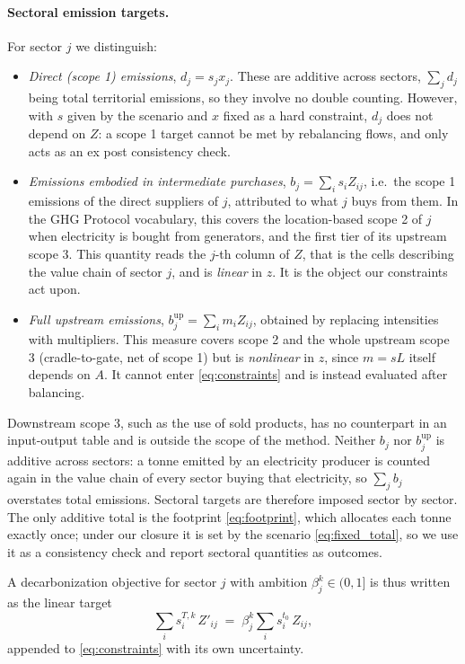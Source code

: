 \documentclass[11pt,a4paper]{article}
\begin{document}
\paragraph{Sectoral emission targets.}
For sector $j$ we distinguish:
\begin{itemize}
  \item \emph{Direct (scope 1) emissions}, $d_j = s_j x_j$. These are additive across
        sectors, $\sum_j d_j$ being total territorial emissions, so they involve no
        double counting. However, with $s$ given by the scenario and $x$ fixed as a hard
        constraint, $d_j$ does not depend on $Z$: a scope 1 target cannot be met by
        rebalancing flows, and only acts as an ex post consistency check.
  \item \emph{Emissions embodied in intermediate purchases},
        $b_j = \sum_i s_i Z_{ij}$, i.e.\ the scope 1 emissions of the direct suppliers
        of $j$, attributed to what $j$ buys from them. In the GHG Protocol vocabulary,
        this covers the location-based scope 2 of $j$ when electricity is bought from
        generators, and the first tier of its upstream scope 3. This quantity reads
        the $j$-th column of $Z$, that is the cells describing the value chain of
        sector $j$, and is \emph{linear} in $z$. It is the object our constraints act
        upon.
  \item \emph{Full upstream emissions}, $b^{\mathrm{up}}_j = \sum_i m_i Z_{ij}$,
        obtained by replacing intensities with multipliers. This measure covers scope 2
        and the whole upstream scope 3 (cradle-to-gate, net of scope 1) but is
        \emph{nonlinear} in $z$, since $m = sL$ itself depends on $A$. It cannot enter
        \eqref{eq:constraints} and is instead evaluated after balancing.
\end{itemize}
Downstream scope 3, such as the use of sold products, has no counterpart in an input-output table and is outside the scope of the method. Neither $b_j$ nor $b^{\mathrm{up}}_j$ is additive across sectors: a tonne emitted by an electricity
producer is counted again in the value chain of every sector buying that electricity, so
$\sum_j b_j$ overstates total emissions. Sectoral targets are therefore imposed sector by
sector. The only additive total is the footprint \eqref{eq:footprint}, which allocates each tonne exactly once; under our closure it is set by the scenario \eqref{eq:fixed_total}, so we use it as a consistency check and report sectoral quantities as outcomes.

A decarbonization objective for sector $j$ with ambition $\beta_j^k \in (0,1]$ is thus
written as the linear target
\begin{equation}\label{eq:decarb}
  \sum_i s_i^{T,k} \, Z'_{ij} \; = \; \beta_j^k \sum_i s_i^{t_0} \, Z_{ij} ,
\end{equation}
appended to \eqref{eq:constraints} with its own uncertainty.
\end{document}

